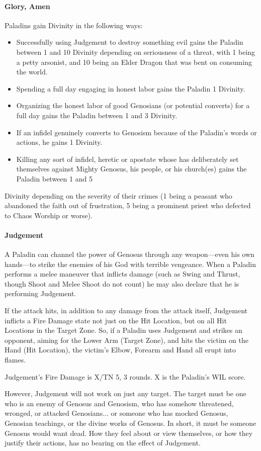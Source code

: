 \documentclass[oneside,11pt,english]{book}
\begin{document}
\paragraph{Glory, Amen}
Paladins gain Divinity in the following ways:
\begin{itemize}
\item Successfully using Judgement to destroy something evil gains the Paladin between 1 and 
10 Divinity depending on seriousness of a threat, with 1 being a petty arsonist, and 10 
being an Elder Dragon that was bent on consuming the world. 
\item Spending a full day engaging in honest labor gains the Paladin 1 Divinity. 
\item Organizing the honest labor of good Genosians (or potential converts) for a full day gains 
the Paladin between 1 and 3 Divinity. 
\item If an infidel genuinely converts to Genosism because of the Paladin's words or actions, he 
gains 1 Divinity. 
\item Killing any sort of infidel, heretic or apostate whose has deliberately set themselves 
against Mighty Genosus, his people, or his church(es) gains the Paladin between 1 and 5 
\end{itemize}
Divinity depending on the severity of their crimes (1 being a peasant who abandoned the faith out of frustration, 5 being a prominent priest who defected to Chaos Worship or worse).
\paragraph{Judgement}
A Paladin can channel the power of Genosus through any weapon—even his own hands—to 
strike the enemies of his God with terrible vengeance. When a Paladin performs a melee 
maneuver that inflicts damage (such as Swing and Thrust, though Shoot and Melee Shoot do not 
count) he may also declare that he is performing Judgement. 


If the attack hits, in addition to any damage from the attack itself, Judgement inflicts a Fire 
Damage state not just on the Hit Location, but on all Hit Locations in the Target Zone. So, if a 
Paladin uses Judgement and strikes an opponent, aiming for the Lower Arm (Target Zone), and 
hits the victim on the Hand (Hit Location), the victim's Elbow, Forearm and Hand all erupt into flames. 


Judgement's Fire Damage is X/TN 5, 3 rounds. X is the Paladin's WIL score. 


However, Judgement will not work on just any target. The target must be one who is an enemy of 
Genosus and Genosism, who has somehow threatened, wronged, or attacked Genosians... or 
someone who has mocked Genosus, Genosian teachings, or the divine works of Genosus. In 
short, it must be someone Genosus would want dead. How they feel about or view themselves, or 
how they justify their actions, has no bearing on the effect of Judgement. 
\end{document}

